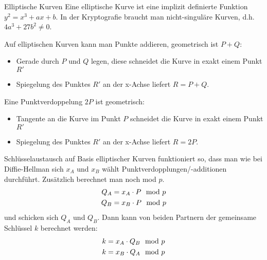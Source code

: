 \documentclass{article}
\begin{document}
	\begin{exkurs}{Elliptische Kurven}
		Eine elliptische Kurve ist eine implizit definierte Funktion $y^2 = x^3 + ax + b$. In der Kryptografie braucht man nicht-singuläre Kurven, d.h. $4a^3 + 27b^2 \neq 0$.
		
		Auf elliptischen Kurven kann man Punkte addieren, geometrisch ist $P+Q$:
		\begin{itemize}
			\item Gerade durch $P$ und $Q$ legen, diese schneidet die Kurve in exakt einem Punkt $R'$
			\item Spiegelung des Punktes $R'$ an der x-Achse liefert $R = P + Q$.
		\end{itemize}
		Eine Punktverdoppelung $2P$ ist geometrisch:
		\begin{itemize}
			\item Tangente an die Kurve im Punkt $P$ schneidet die Kurve in exakt einem Punkt $R'$
			\item Spiegelung des Punktes $R'$ an der x-Achse liefert $R = 2P$.
		\end{itemize}
	
		Schlüsselaustausch auf Basis elliptischer Kurven funktioniert so, dass man wie bei Diffie-Hellman sich $x_A$ und $x_B$ wählt Punktverdopplungen/-additionen durchführt. Zusätzlich berechnet man noch mod $p$.
		\begin{align}
			Q_A &= x_A\cdot P \mod p \notag \\
			Q_B &= x_B\cdot P \mod p \notag
		\end{align}
		und schicken sich $Q_A$ und $Q_B$. Dann kann von beiden Partnern der gemeinsame Schlüssel $k$ berechnet werden:
		\begin{align}
			k &= x_A\cdot Q_B \mod p \notag \\
			k &= x_B\cdot Q_A \mod p \notag
		\end{align}
	\end{exkurs}
	
\end{document}
